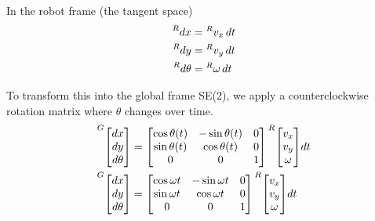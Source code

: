 In the robot frame (the tangent space)
\begin{align*}
  \prescript{R}{}{dx} &= \prescript{R}{}{v_x} \,dt \\
  \prescript{R}{}{dy} &= \prescript{R}{}{v_y} \,dt \\
  \prescript{R}{}{d\theta} &= \prescript{R}{}{\omega} \,dt
\end{align*}

To transform this into the global frame SE(2), we apply a counterclockwise
rotation matrix where $\theta$ changes over time.
\begin{align*}
  \prescript{G}{}{\begin{bmatrix}
    dx \\
    dy \\
    d\theta
  \end{bmatrix}} &=
  \begin{bmatrix}
    \cos\theta(t) & -\sin\theta(t) & 0 \\
    \sin\theta(t) &  \cos\theta(t) & 0 \\
                0 &              0 & 1
  \end{bmatrix}
  \prescript{R}{}{\begin{bmatrix}
    v_x \\
    v_y \\
    \omega
  \end{bmatrix}} dt \\
  \prescript{G}{}{\begin{bmatrix}
    dx \\
    dy \\
    d\theta
  \end{bmatrix}} &=
  \begin{bmatrix}
    \cos\omega t & -\sin\omega t & 0 \\
    \sin\omega t &  \cos\omega t & 0 \\
               0 &             0 & 1
  \end{bmatrix}
  \prescript{R}{}{\begin{bmatrix}
    v_x \\
    v_y \\
    \omega
  \end{bmatrix}} dt
\end{align*}


